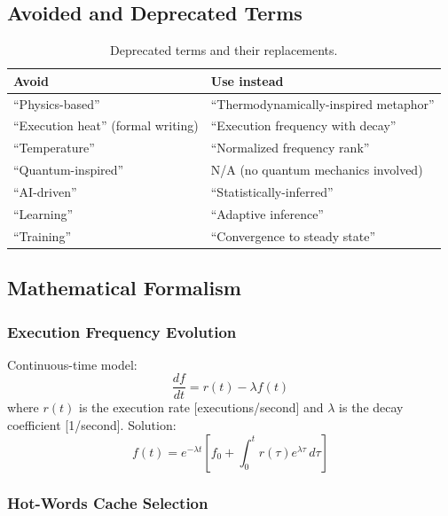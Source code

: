 \subsection{Avoided and Deprecated Terms}

\begin{table}[h]
\centering
\caption{Deprecated terms and their replacements.}
\begin{tabular}{ll}
\toprule
\textbf{Avoid} & \textbf{Use instead} \\
\midrule
``Physics-based'' & ``Thermodynamically-inspired metaphor'' \\
``Execution heat'' (formal writing) & ``Execution frequency with decay'' \\
``Temperature'' & ``Normalized frequency rank'' \\
``Quantum-inspired'' & N/A (no quantum mechanics involved) \\
``AI-driven'' & ``Statistically-inferred'' \\
``Learning'' & ``Adaptive inference'' \\
``Training'' & ``Convergence to steady state'' \\
\bottomrule
\end{tabular}
\end{table}

\subsection{Mathematical Formalism}

\subsubsection{Execution Frequency Evolution}

Continuous-time model:
\begin{equation}
  \frac{df}{dt} = r(t) - \lambda f(t)
\end{equation}
where $r(t)$ is the execution rate [executions/second] and $\lambda$ is
the decay coefficient [1/second]. Solution:
\begin{equation}
  f(t) = e^{-\lambda t}\!\left[f_0 + \int_0^t r(\tau) e^{\lambda\tau}\,d\tau\right]
\end{equation}

\subsubsection{Hot-Words Cache Selection}

